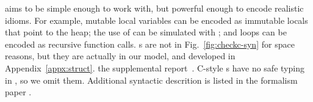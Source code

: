 \lang aims to be simple enough to work with, but powerful enough to
encode realistic \systemname idioms. For example, mutable local
variables can be encoded as immutable locals that point to the heap;
the use of \code{&} can be simulated with ;
and loops can be encoded as recursive function calls. s are
not in Fig.~\ref{fig:checkc-syn} for space reasons, but they are
actually in our model, and developed in
\iftr
Appendix~\ref{appx:struct}.
\else
the supplemental report~\cite{checkedc-tech-report}.
\fi
C-style s have no safe typing
in \checkedc, so we omit them.
Additional syntactic descrition is listed in the \checkedc formalism paper \cite{li22checkedc}.



